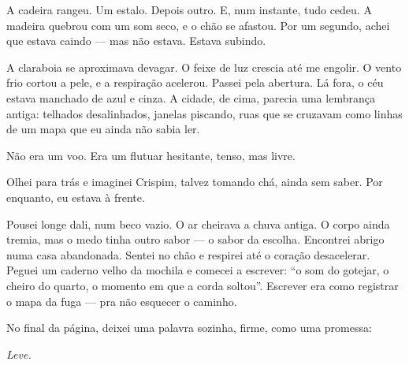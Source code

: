 A cadeira rangeu. Um estalo. Depois outro.  
E, num instante, tudo cedeu.  
A madeira quebrou com um som seco, e o chão se afastou.  
Por um segundo, achei que estava caindo — mas não estava.  
Estava subindo.

A claraboia se aproximava devagar. O feixe de luz crescia até me engolir. O vento frio cortou a pele, e a respiração acelerou.  
Passei pela abertura. Lá fora, o céu estava manchado de azul e cinza.  
A cidade, de cima, parecia uma lembrança antiga: telhados desalinhados, janelas piscando, ruas que se cruzavam como linhas de um mapa que eu ainda não sabia ler.

Não era um voo. Era um flutuar hesitante, tenso, mas livre.

Olhei para trás e imaginei Crispim, talvez tomando chá, ainda sem saber.  
Por enquanto, eu estava à frente.

Pousei longe dali, num beco vazio. O ar cheirava a chuva antiga. O corpo ainda tremia, mas o medo tinha outro sabor — o sabor da escolha.  
Encontrei abrigo numa casa abandonada. Sentei no chão e respirei até o coração desacelerar.  
Peguei um caderno velho da mochila e comecei a escrever:  
“o som do gotejar, o cheiro do quarto, o momento em que a corda soltou”.  
Escrever era como registrar o mapa da fuga — pra não esquecer o caminho.

No final da página, deixei uma palavra sozinha, firme, como uma promessa:  

\emph{Leve.}
